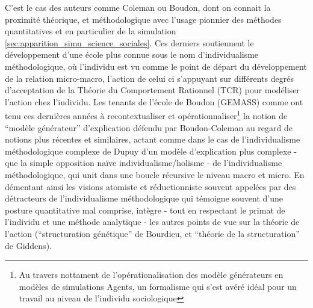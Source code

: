 C'est le cas des auteurs comme Coleman ou Boudon, dont on connait la proximité théorique, et méthodologique avec l'usage pionnier des méthodes quantitatives et en particulier de la simulation \ref{sec:apparition_simu_science_sociales}. Ces derniers soutiennent le développement d'une école plus connue sous le nom d'individualisme méthodologique, où l'individu est vu comme le point de départ du développement de la relation micro-macro, l'action de celui ci s'appuyant sur différents degrés d'acceptation de la Théorie du Comportement Rationnel (TCR) pour modéliser l'action chez l'individu. Les tenants de l'école de Boudon (GEMASS) comme \textcite{Manzo2007, Manzo2005} ont tenu ces dernières années à recontextualiser et opérationnaliser\footnote{Au travers nottament de l'opérationalisation des modèle générateurs en modèles de simulations Agents, un formalisme qui s'est avéré idéal pour un travail au niveau de l'individu sociologique} la notion de \enquote{modèle générateur}  d'explication défendu par Boudon-Coleman au regard de notions plus récentes et similaires, actant comme dans le cas de l'individualisme méthodologique complexe de Dupuy d'un modèle d'explication plus complexe  - que la simple opposition naïve individualisme/holisme - de l'individualisme méthodologique, qui unit dans une boucle récursive le niveau macro et micro. En démentant ainsi les visions atomiste et réductionniste souvent appelées par des détracteurs de l'individualisme méthodologique qui témoigne souvent d'une posture quantitative mal comprise, \textcite{Manzo2007} intègre - tout en respectant le primat de l'individu et une méthode analytique - les autres points de vue sur la théorie de l'action (\enquote{structuration génétique} de Bourdieu, et \enquote{théorie de la structuration} de Giddens).


